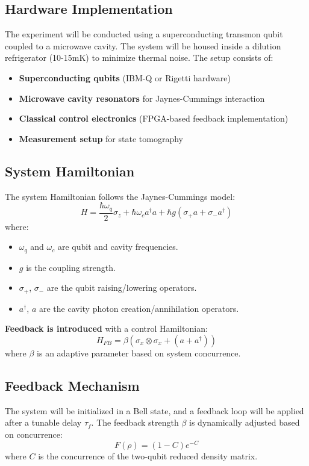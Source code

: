\documentclass[a4paper,12pt]{article}
\begin{document}
\subsection{Hardware Implementation}
The experiment will be conducted using a superconducting transmon qubit coupled to a microwave cavity. The system will be housed inside a dilution refrigerator (10-15mK) to minimize thermal noise. The setup consists of:
\begin{itemize}
    \item \textbf{Superconducting qubits} (IBM-Q or Rigetti hardware)
    \item \textbf{Microwave cavity resonators} for Jaynes-Cummings interaction
    \item \textbf{Classical control electronics} (FPGA-based feedback implementation)
    \item \textbf{Measurement setup} for state tomography
\end{itemize}

\subsection{System Hamiltonian}
The system Hamiltonian follows the Jaynes-Cummings model:
\begin{equation}
H = \frac{\hbar \omega_q}{2} \sigma_z + \hbar \omega_c a^\dagger a + \hbar g (\sigma_+ a + \sigma_- a^\dagger)
\end{equation}
where:
\begin{itemize}
    \item \( \omega_q \) and \( \omega_c \) are qubit and cavity frequencies.
    \item \( g \) is the coupling strength.
    \item \( \sigma_+ \), \( \sigma_- \) are the qubit raising/lowering operators.
    \item \( a^\dagger \), \( a \) are the cavity photon creation/annihilation operators.
\end{itemize}

\textbf{Feedback is introduced} with a control Hamiltonian:
\begin{equation}
H_{FB} = \beta ( \sigma_x \otimes \sigma_x + (a + a^\dagger) )
\end{equation}
where \( \beta \) is an adaptive parameter based on system concurrence.

\subsection{Feedback Mechanism}
The system will be initialized in a Bell state, and a feedback loop will be applied after a tunable delay \( \tau_f \). The feedback strength \( \beta \) is dynamically adjusted based on concurrence:
\begin{equation}
F(\rho) = (1 - C) e^{-C}
\end{equation}
where \( C \) is the concurrence of the two-qubit reduced density matrix.
\end{document}
